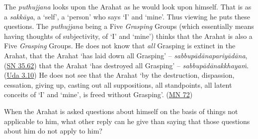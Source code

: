 The \textit{puthujjana} looks upon the Arahat as he would look upon himself. That is as a \textit{sakkāya}, a `self', a `person' who says `I' and `mine'. Thus viewing he puts these questions. The \textit{puthujjana} being a Five \emph{Grasping} Groups (which essentially means having thoughts of subjectivity, of `I' and `mine') thinks that the Arahat is also a Five \emph{Grasping} Groups. He does not know that \emph{all} Grasping is extinct in the Arahat, that the Arahat `has laid down all Grasping' -- \textit{sabbupādānapariyādāna}, (\href{https://suttacentral.net/sn35.62/en/bodhi}{SN 35.62}) that the Arahat `has destroyed all Grasping' -- \textit{sabbupādānakkhayaṁ}. (\href{https://suttacentral.net/ud3.10/en/anandajoti}{Uda 3.10}) He does not see that the Arahat `by the destruction, dispassion, cessation, giving up, casting out all suppositions, all standpoints, all latent conceits of `I' and `mine', is freed without Grasping'. (\href{https://suttacentral.net/mn72/en/thanissaro}{MN 72})

When the Arahat is asked questions about himself on the basis of things not applicable to him, what other reply can he give than saying that those questions about him do not apply to him?

